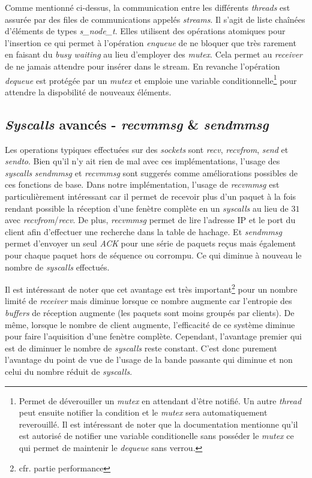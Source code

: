 \documentclass[../main.tex]{subfiles}
\begin{document}
Comme mentionné ci-dessus, la communication entre les différents \textit{threads} est assurée par des files de communications appelés \textit{streams}.
Il s'agit de liste chaînées d'éléments de types \textit{s\_node\_t}. Elles utilisent des opérations atomiques pour l'insertion ce qui permet
à l'opération \textit{enqueue} de ne bloquer que très rarement en faisant du \textit{busy waiting} au lieu d'employer des \textit{mutex}. Cela permet
au \textit{receiver} de ne jamais attendre pour insérer dans le stream. En revanche l'opération \textit{dequeue} est protégée par un \textit{mutex} et
emploie une variable conditionnelle\footnote{ Permet de déverouiller un \textit{mutex} en attendant d'être notifié. Un autre \textit{thread} peut ensuite notifier
la condition et le \textit{mutex} sera automatiquement reverouillé. Il est intéressant de noter que la documentation mentionne qu'il est autorisé
de notifier une variable conditionelle sans posséder le \textit{mutex} ce qui permet de maintenir le \textit{dequeue} sans verrou. } pour attendre la dispobilité de nouveaux éléments.

\subsection{\textit{Syscalls} avancés - \textit{recvmmsg} \& \textit{sendmmsg}}
\label{sec:syscalls}

Les operations typiques effectuées sur des \textit{sockets} sont \textit{recv}, \textit{recvfrom}, \textit{send} et \textit{sendto}. Bien qu'il n'y ait rien
de mal avec ces implémentations, l'usage des \textit{syscalls} \textit{sendmmsg} et \textit{recvmmsg} sont suggerés comme améliorations possibles\cite{that_awesome_paper}
de ces fonctions de base. Dans notre implémentation, l'usage de \textit{recvmmsg} est particulièrement intéressant car il permet de recevoir plus d'un paquet à la fois
rendant possible la réception d'une fenètre complète en un \textit{syscalls} au lieu de $31$ avec \textit{recvfrom}/\textit{recv}. De plus, \textit{recvmmsg} permet
de lire l'adresse IP et le port du client afin d'effectuer une recherche dans la table de hachage. Et \textit{sendmmsg} permet d'envoyer un seul \textit{ACK} pour
une série de paquets reçus mais également pour chaque paquet hors de séquence ou corrompu. Ce qui diminue à nouveau le nombre de \textit{syscalls} effectués.

Il est intéressant de noter que cet avantage est très important\footnote{ cfr. partie performance} pour un nombre limité de \textit{receiver} mais diminue lorsque  
ce nombre augmente car l'entropie des \textit{buffers} de réception augmente (les paquets sont moins groupés par clients). De même, lorsque le nombre de client augmente,
 l'efficacité de ce système diminue pour faire l'aquisition d'une fenètre complète. Cependant, l'avantage premier qui est de diminuer le nombre de \textit{syscalls} 
 reste constant. C'est donc purement l'avantage du point de vue de l'usage de la bande passante qui diminue et non celui du nombre réduit de \textit{syscalls}. 
\end{document}

